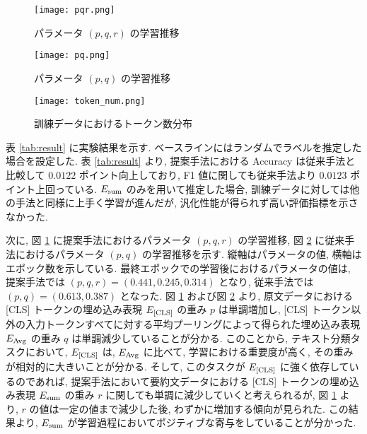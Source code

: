\documentclass[twocolumn]{jarticle}
\begin{document}
\begin{figure}[h]
  \begin{center}
    \texttt{[image: pqr.png]}
    \caption{パラメータ $(p, q, r)$ の学習推移} %
    \label{fig:pqr} %
  \end{center}
\end{figure}

\begin{figure}[h]
  \begin{center}
    \texttt{[image: pq.png]}
    \caption{パラメータ $(p, q)$ の学習推移} %
    \label{fig:pq} %
  \end{center}
\end{figure}

\begin{figure}[th]
  \begin{center}
    \texttt{[image: token\_num.png]}
    \caption{訓練データにおけるトークン数分布} %
    \label{fig:token_num} %
  \end{center}
\end{figure}



表 \ref{tab:result} に実験結果を示す. ベースラインにはランダムでラベルを推定した場合を設定した. 表 \ref{tab:result} より, 提案手法における Accuracy は従来手法と比較して $0.0122$ ポイント向上しており, F1 値に関しても従来手法より $0.0123$ ポイント上回っている. $E_{\rm{sum}}$ のみを用いて推定した場合, 訓練データに対しては他の手法と同様に上手く学習が進んだが, 汎化性能が得られず高い評価指標を示さなかった.

次に, 図 \ref{fig:pqr} に提案手法におけるパラメータ $(p, q, r)$ の学習推移, 図 \ref{fig:pq} に従来手法におけるパラメータ $(p, q)$ の学習推移を示す. 縦軸はパラメータの値, 横軸はエポック数を示している. 最終エポックでの学習後におけるパラメータの値は, 提案手法では $(p, q, r) = (0.441, 0.245, 0.314)$ となり, 従来手法では $(p, q) = (0.613, 0.387)$ となった. 図 \ref{fig:pqr} および図 \ref{fig:pq} より, 原文データにおける [CLS] トークンの埋め込み表現 $E_{\rm{[CLS]}}$ の重み $p$ は単調増加し, [CLS] トークン以外の入力トークンすべてに対する平均プーリングによって得られた埋め込み表現 $E_{\rm{Avg}}$ の重み $q$ は単調減少していることが分かる. このことから, テキスト分類タスクにおいて, $E_{\rm{[CLS]}}$ は, $E_{\rm{Avg}}$ に比べて, 学習における重要度が高く, その重みが相対的に大きいことが分かる. そして, このタスクが $E_{\rm{[CLS]}}$ に強く依存しているのであれば, 提案手法において要約文データにおける [CLS] トークンの埋め込み表現 $E_{\rm{sum}}$ の重み $r$ に関しても単調に減少していくと考えられるが, 図 \ref{fig:pqr} より, $r$ の値は一定の値まで減少した後, わずかに増加する傾向が見られた. この結果より, $E_{\rm{sum}}$ が学習過程においてポジティブな寄与をしていることが分かった.
\end{document}
